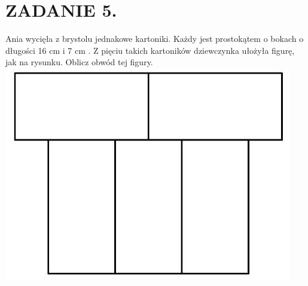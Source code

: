 \documentclass[10pt]{article}
\begin{document}
\section*{ZADANIE 5.}
Ania wycięła z brystolu jednakowe kartoniki. Każdy jest prostokątem o bokach o długości 16 cm i 7 cm . Z pięciu takich kartoników dziewczynka ułożyła figurę, jak na rysunku. Oblicz obwód tej figury.\\
\includegraphics[max width=\textwidth, center]{2024_11_21_eba7c96c109b192ab548g-1}
\end{document}
